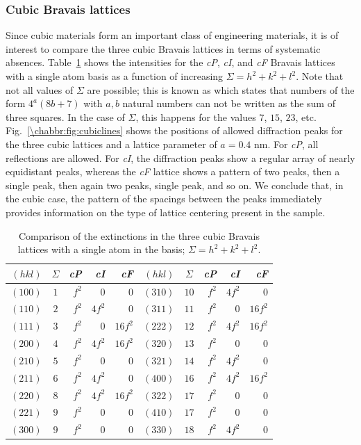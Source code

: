 \subsubsection{Cubic Bravais lattices}
Since cubic materials form an important class of engineering materials, it is of interest to compare the three cubic Bravais lattices in terms of systematic absences. Table~\ref{\chabbr:tb:cubicintensities} shows the intensities for the \textit{cP}, \textit{cI}, and \textit{cF} Bravais lattices with a single atom basis as a function of increasing $\Sigma=h^2+k^2+l^2$.  Note that not all values of $\Sigma$ are possible; this is known as  which states that numbers of the form $4^a(8b+7)$ with $a,b$ natural numbers can not be written as the sum of three squares.  In the case of $\Sigma$, this happens for the values $7$, $15$, $23$, etc.  Fig.~\ref{\chabbr:fig:cubiclines} shows the positions of allowed diffraction peaks for the three cubic lattices and a lattice parameter of $a=0.4$ nm.  For \textit{cP}, all reflections are allowed. For \textit{cI}, the diffraction peaks show a regular array of nearly equidistant peaks, whereas the \textit{cF} lattice shows a pattern of two peaks, then a single peak, then again two peaks, single peak, and so on.  We conclude that, in the cubic case, the pattern of the spacings between the peaks immediately provides information on the type of lattice centering present in the sample. 

\begin{table}[t]
\centering\leavevmode
\begin{tabular}{|r|c|r|r|r||r|c|r|r|r|}
\hline
$(hkl)$ & $\Sigma$ & \textit{cP} & \textit{cI} & \textit{cF}&$(hkl)$ & $\Sigma$ & \textit{cP} & \textit{cI} & \textit{cF}\\
\hline\hline
$(100)$ & $ 1$ & $f^2$ & $0$ &$0$&$(310)$ & $10$ & $f^2$ & $4f^2$ &$0$ \\
$(110)$ & $ 2$ & $f^2$ & $4f^2$ &$0$ &$(311)$ & $11$ & $f^2$ & $0$ &$16f^2$\\
$(111)$ & $ 3$ & $f^2$ & $0$ &$16f^2$&$(222)$ & $12$ & $f^2$ & $4f^2$ &$16f^2$\\
$(200)$ & $ 4$ & $f^2$ & $4f^2$ &$16f^2$&$(320)$ & $13$ & $f^2$ & $0$ &$0$ \\
$(210)$ & $ 5$ & $f^2$ & $0$ &$0$&$(321)$ & $14$ & $f^2$ & $4f^2$ &$0$ \\
$(211)$ & $ 6$ & $f^2$ & $4f^2$ &$0$&$(400)$ & $16$ & $f^2$ & $4f^2$ &$16f^2$\\
$(220)$ & $ 8$ & $f^2$ & $4f^2$ &$16f^2$&$(322)$ & $17$ & $f^2$ & $0$ &$0$ \\
$(221)$ & $ 9$ & $f^2$ & $0$ &$0$ &$(410)$ & $17$ & $f^2$ & $0$ &$0$ \\
$(300)$ & $ 9$ & $f^2$ & $0$ &$0$& $(330)$ & $18$ & $f^2$ & $4f^2$ &$0$ \\
\hline
\end{tabular}
\caption{\label{\chabbr:tb:cubicintensities}Comparison of the extinctions in the three cubic Bravais lattices with a single atom in the basis; $\Sigma=h^2+k^2+l^2$.}
\end{table}

